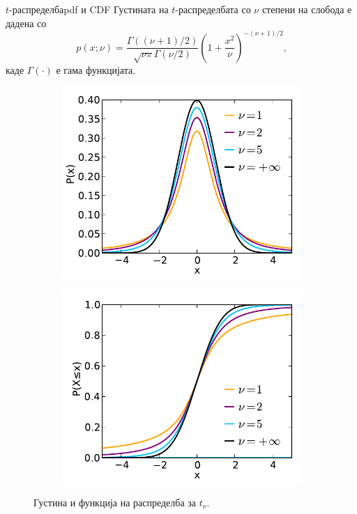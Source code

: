 \documentclass[hyperref={unicode}, xcolor={svgnames, table},
usepdftitle=false]{beamer}
\theoremstyle{remark}
\begin{document}
\begin{frame}{\(t\)-распределба}{pdf и CDF}
  Густината на \(t\)-распределбата со \(\nu\) степени на слобода е дадена со
  \[
    p(x; \nu) = \frac{\Gamma((\nu + 1) / {2})}{\sqrt{\nu \pi} \Gamma(\nu / {2})}
    \left(1 + \frac{x^2}{\nu}\right)^{- (\nu + 1) / {2}}\text{,}
  \]
  каде \(\Gamma(\cdot)\) е гама функцијата.
  \begin{figure}
    \centering
    \begin{subfigure}[b]{.45\linewidth}
      \includegraphics[width=\textwidth]{t_pdf.pdf}
    \end{subfigure}
    \begin{subfigure}[b]{.45\linewidth}
      \includegraphics[width=\textwidth]{t_CDF.pdf}
    \end{subfigure}
    \caption{Густина и функција на распределба за \(t_{\nu}\).}
  \end{figure}
\end{frame}
\end{document}
